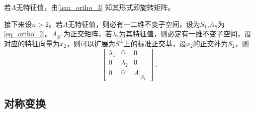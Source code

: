 若$A$无特征值，由\autoref{lem_ortho_3} 知其形式即旋转矩阵。

接下来设$n>2$。若$A$无特征值，则必有一二维不变子空间，设为$S_1$,$A_{S}$为\autoref{eq_ortho_2}。$A_{S^{\bot}}$为正交矩阵，若$\lambda_2$为其特征值，则必定有一维不变子空间，设对应的特征向量为$x_2$，则可以扩展为$S^{\bot}$上的标准正交基，设$x_2$的正交补为$S_2$，则
\begin{equation}
\left[\begin{array}{rrr}
\lambda_1&0&0\\
0&\lambda_2&0\\
0&0&A|_{S_2}
\end{array}
\right]~.
\end{equation}
\subsection{对称变换}


